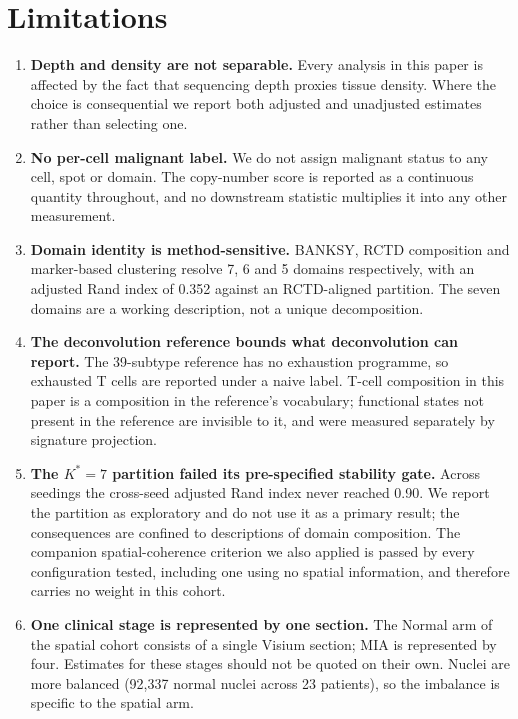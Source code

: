 \section{Limitations}

\begin{enumerate}\itemsep2pt

\item \textbf{Depth and density are not separable.} Every analysis in this paper is
affected by the fact that sequencing depth proxies tissue density. Where the choice is
consequential we report both adjusted and unadjusted estimates rather than selecting one.

\item \textbf{No per-cell malignant label.} We do not assign malignant status to any cell,
spot or domain. The copy-number score is reported as a continuous quantity throughout, and
no downstream statistic multiplies it into any other measurement.

\item \textbf{Domain identity is method-sensitive.} BANKSY, RCTD composition and
marker-based clustering resolve 7, 6 and 5 domains respectively, with an adjusted Rand
index of 0.352 against an RCTD-aligned partition. The seven domains are a working
description, not a unique decomposition.

\item \textbf{The deconvolution reference bounds what deconvolution can report.} The
39-subtype reference has no exhaustion programme, so exhausted T cells are reported under a
naive label. T-cell composition in this paper is a composition in the reference's
vocabulary; functional states not present in the reference are invisible to it, and were
measured separately by signature projection.

\item \textbf{The $K^{*}=7$ partition failed its pre-specified stability gate.} Across
seedings the cross-seed adjusted Rand index never reached 0.90. We report the partition as
exploratory and do not use it as a primary result; the consequences are confined to
descriptions of domain composition. The companion spatial-coherence criterion we also
applied is passed by every configuration tested, including one using no spatial
information, and therefore carries no weight in this cohort.

\item \textbf{One clinical stage is represented by one section.} The Normal arm of the
spatial cohort consists of a single Visium section; MIA is represented by four. Estimates
for these stages should not be quoted on their own. Nuclei are more balanced (92,337
normal nuclei across 23 patients), so the imbalance is specific to the spatial arm.


\end{enumerate}
